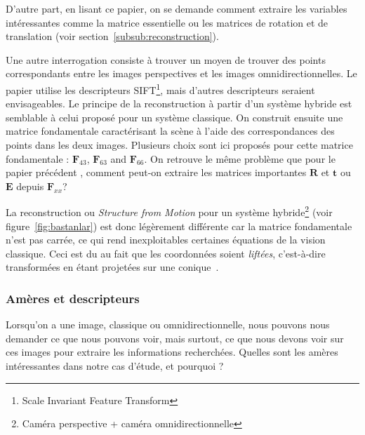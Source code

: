 D'autre part, en lisant ce papier, on se demande comment extraire les variables intéressantes comme la matrice essentielle ou les matrices de rotation et de translation (voir section~\ref{subsub:reconstruction}).

Une autre interrogation consiste à trouver un moyen de trouver des points correspondants entre les images perspectives et les images omnidirectionnelles.
Le papier \cite{Puig08} utilise les descripteurs SIFT\footnote{Scale Invariant Feature Transform}, mais d'autres descripteurs seraient envisageables.
Le principe de la reconstruction à partir d'un système hybride est semblable à celui proposé pour un système classique.
On construit ensuite une matrice fondamentale caractérisant la scène à l'aide des correspondances des points dans les deux images.
Plusieurs choix sont ici proposés pour cette matrice fondamentale : $\mathbf{F}_{43}$, $\mathbf{F}_{63}$ and $\mathbf{F}_{66}$.
On retrouve le même problème que pour le papier précédent \cite{Sturm02}, comment peut-on extraire les matrices importantes $\mathbf{R}$ et $\mathbf{t}$ ou $\mathbf{E}$ depuis $\mathbf{F}_{xx}$?

 
  La reconstruction ou \emph{Structure from Motion} pour un système hybride\footnote{Caméra perspective + caméra omnidirectionnelle} \cite{Bastanlar09PhD} (voir figure~\ref{fig:bastanlar}) est donc légèrement différente car la matrice fondamentale n'est pas carrée, ce qui rend inexploitables certaines équations de la vision classique.
Ceci est du au fait que les coordonnées soient \emph{liftées}, c'est-à-dire transformées en étant projetées sur une conique~\cite{Sturm07}.


\subsubsection{Amères et descripteurs}

Lorsqu'on a une image, classique ou omnidirectionnelle, nous pouvons nous demander ce que nous pouvons voir, mais surtout, ce que nous devons voir sur ces images pour extraire les informations recherchées.
Quelles sont les amères intéressantes dans notre cas d'étude, et pourquoi ?


